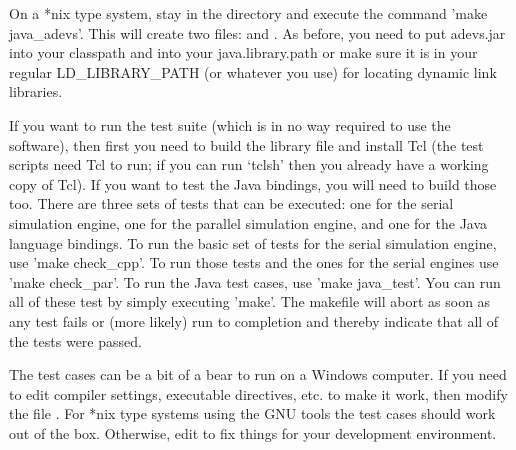 On a *nix type system, stay in the  directory and execute the command 'make java\_adevs'. This will create two files:  and . As before, you need to put adevs.jar into your classpath and  into your java.library.path or make sure it is in your regular LD\_LIBRARY\_PATH (or whatever you use) for locating dynamic link libraries.

If you want to run the test suite (which is in no way required to use the software), then first you need to build the library file and install Tcl (the test scripts need Tcl to run; if you can run `tclsh' then you already have a working copy of Tcl). If you want to test the Java bindings, you will need to build those too. There are three sets of tests that can be executed: one for the serial simulation engine, one for the parallel simulation engine, and one for the Java language bindings. To run the basic set of tests for the serial simulation engine, use 'make check\_cpp'. To run those tests and the ones for the serial engines use 'make check\_par'. To run the Java test cases, use 'make java\_test'. You can run all of these test by simply executing 'make'. The makefile will abort as soon as any test fails or (more likely) run to completion and thereby indicate that all of the tests were passed.

The test cases can be a bit of a bear to run on a Windows computer. If you need to edit compiler settings, executable directives, etc. to make it work, then modify the file . For *nix type systems using the GNU tools the test cases should work out of the box. Otherwise, edit  to fix things for your development environment.
